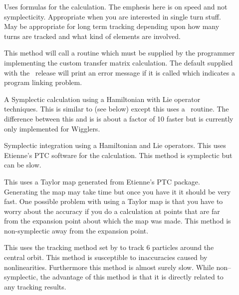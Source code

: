 \begin{description}

\item[]
Uses formulas for the calculation. The emphesis here is on speed and not
symplecticity. Appropriate when you are interested in single turn
stuff. May be appropriate for long term tracking depending upon how
many turns are tracked and what kind of elements are involved. 

\item[]
This method will call a routine  which must be
supplied by the programmer implementing the custom transfer matrix
calculation. The default  supplied with the \bmad\
release will print an error message if it is called which indicates a
program linking problem.

\item[]
A Symplectic calculation using a Hamiltonian with Lie operator techniques.
This is similar to  (see below) except this uses a
\bmad\ routine.  The difference between this and \vn{Symp_Lie_PTC} is
\vn{Symp_Lie_Bmad} is about a factor of 10 faster but  is
currently only implemented for Wigglers.

\item[]
Symplectic integration using a Hamiltonian and Lie operators.
This uses Etienne's PTC software for the calculation.
This method is symplectic but can be slow.

\item[]
This uses a Taylor map generated from Etienne's PTC
package. Generating the map may take time but once you have it it
should be very fast. One possible problem with using a Taylor map is
that you have to worry about the accuracy if you do a calculation at points
that are far from the expansion point about which the map was
made. This method is non-symplectic away from the expansion point. 

\item[]
This uses the tracking method set by  to track 6
particles around the central orbit. This method is susceptible to inaccuracies
caused by nonlinearities. Furthermore this method
is almost surely slow. While non--symplectic, the advantage of this method
is that it is directly related to any tracking results.

\end{description}

